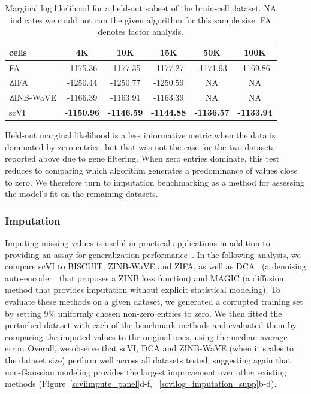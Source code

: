 \begin{table}
    \centering
    \begin{small}
    \begin{tabular}{lccccc}
        \toprule
        \bfseries cells& \bfseries 4K & \bfseries 10K & \bfseries 15K & \bfseries 50K & \bfseries 100K \\
      \midrule
      FA & -1175.36 &  -1177.35 &  -1177.27 &  -1171.93 &  -1169.86 \\
    ZIFA & -1250.44 & -1250.77 & -1250.59 & NA & NA \\
    ZINB-WaVE & -1166.39 & -1163.91 & -1163.39 & NA & NA \\
    scVI & \textbf{-1150.96} & \textbf{-1146.59} & \textbf{-1144.88} & \textbf{-1136.57} & \textbf{-1133.94} \\
      \bottomrule
    \end{tabular}
\end{small}
     \caption[Marginal log likelihood for a held-out subset of the brain-cell dataset]{Marginal log likelihood for a held-out subset of the brain-cell dataset. NA indicates we could not run the given algorithm for this sample size. FA denotes factor analysis.}
     \label{scviLL}
    \end{table}
        
Held-out marginal likelihood is a less informative metric when the data is dominated by zero entries, but that was not the case for the two datasets reported above due to gene filtering. When zero entries dominate, this test reduces to comparing which algorithm generates a predominance of values close to zero. We therefore turn to imputation benchmarking as a method for assessing the model's fit on the remaining datasets.

\subsubsection{Imputation}

Imputing missing values is useful in practical applications in addition to providing an assay for generalization performance~\cite{magic}. In the following analysis, we compare scVI to BISCUIT, ZINB-WaVE and ZIFA, as well as DCA~\cite{dca} (a denoising auto-encoder~\cite{VincentPASCALVINCENT2010} that proposes a ZINB loss function) and MAGIC (a diffusion method that provides imputation without explicit statistical modeling). To evaluate these methods on a given dataset, we generated a corrupted training set by setting $9\%$ uniformly chosen non-zero entries to zero. We then fitted the perturbed dataset with each of the benchmark methods and evaluated them by comparing the imputed values to the original ones, using the median average error. Overall, we observe that scVI, DCA and ZINB-WaVE (when it scales to the dataset size) perform well across all datasets tested, suggesting again that non-Gaussian modeling provides the largest improvement over other existing methods (Figure~\ref{scviimpute_panel}d-f, ~\ref{scvilog_imputation_supp}b-d).

